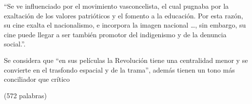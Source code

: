     \begin{compactitem}
    \item ``Se ve influenciado por el movimiento vasconcelista, el cual pugnaba por la exaltación de los valores patrióticos y el fomento a la educación. Por esta razón, su cine exalta el nacionalismo, e incorpora la imagen nacional \ldots, sin embargo, su cine puede llegar a ser también promotor del indigenismo y de la denuncia social.''\autocite[9-10]{aguilar_construccion_2014}.
    \item Se considera que ``en sus películas la Revolución tiene una centralidad menor y se convierte en el
    trasfondo espacial y  de la trama''\autocite[111]{piedras_narrativas_2012}, además tienen un tono más conciliador que crítico\autocite{piedras_narrativas_2012}
    \end{compactitem} 

(572 palabras)
\pagebreak

